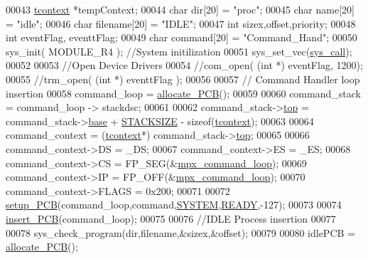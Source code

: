 \begin{DoxyCode}
00043         \hyperlink{structcontext}{tcontext} *tempContext;
00044         \textcolor{keywordtype}{char} dir[20] = \textcolor{stringliteral}{"proc"};
00045         \textcolor{keywordtype}{char} name[20] = \textcolor{stringliteral}{"idle"};
00046         \textcolor{keywordtype}{char} filename[20] = \textcolor{stringliteral}{"IDLE"};
00047         \textcolor{keywordtype}{int} sizex,offset,priority;
00048         \textcolor{keywordtype}{int} eventFlag, eventtFlag;
00049         \textcolor{keywordtype}{char} command[20] = \textcolor{stringliteral}{"Command\_Hand"};
00050         sys\_init( MODULE\_R4 ); \textcolor{comment}{//System initilization}
00051         sys\_set\_vec(\hyperlink{mpx__r3_8c_abeb8ddb92acb8fa40e902b98f2a1ccfb}{sys_call});
00052 
00053         \textcolor{comment}{//Open Device Drivers}
00054         \textcolor{comment}{//com\_open( (int *) eventFlag, 1200);}
00055        \textcolor{comment}{//trm\_open(  (int *) eventtFlag );}
00056 
00057         \textcolor{comment}{// Command Handler loop insertion}
00058         command\_loop = \hyperlink{mpx__r2_8c_a58a8a1ea0a96b9ecf0be29179a5a0a1e}{allocate_PCB}();
00059 
00060         command\_stack = command\_loop -> stackdsc;
00061 
00062         command\_stack->\hyperlink{structstack_adf145fa22a24464ff19409e2618a583d}{top} = command\_stack->\hyperlink{structstack_a1cdb71e486a79747d482aa46f6b10290}{base} + \hyperlink{mpx__r2_8h_a21d9543c516fffee84a7963224271f95}{STACKSIZE} - \textcolor{keyword}{sizeof}(\hyperlink{structcontext}{tcontext});
00063 
00064         command\_context = (\hyperlink{structcontext}{tcontext}*) command\_stack->\hyperlink{structstack_adf145fa22a24464ff19409e2618a583d}{top};
00065 
00066         command\_context->DS = \_DS;
00067         command\_context->ES = \_ES;
00068         command\_context->CS = FP\_SEG(&\hyperlink{_m_p_x___c_m_d_8_c_ab2f64c5ce0432edca230a87739501703}{mpx_command_loop});
00069         command\_context->IP = FP\_OFF(&\hyperlink{_m_p_x___c_m_d_8_c_ab2f64c5ce0432edca230a87739501703}{mpx_command_loop});
00070         command\_context->FLAGS = 0x200;
00071 
00072         \hyperlink{mpx__r2_8c_a316c9619aba53c03c17afbc0a0dbf096}{setup_PCB}(command\_loop,command,\hyperlink{mpx__r2_8h_a21b97df85e65556468b28a576311271c}{SYSTEM},\hyperlink{mpx__r2_8h_ad1235d5ce36f7267285e82dccd428aa6}{READY},-127);
00073 
00074         \hyperlink{mpx__r2_8c_aa3b334e3a5afd6e590917667ad359a6f}{insert_PCB}(command\_loop);
00075 
00076         \textcolor{comment}{//IDLE Process insertion}
00077 
00078         sys\_check\_program(dir,filename,&sizex,&offset);
00079 
00080         idlePCB = \hyperlink{mpx__r2_8c_a58a8a1ea0a96b9ecf0be29179a5a0a1e}{allocate_PCB}();

\end{DoxyCode}
